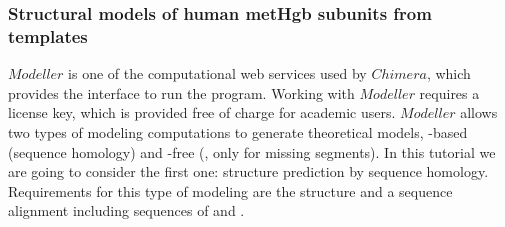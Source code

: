 \subsubsection*{Structural models of human metHgb subunits from templates}

 $Modeller$ \citep{sali1993} is one of the computational web services used by $Chimera$, which provides the interface to run the program. Working with $Modeller$ requires a license key, which is provided free of charge for academic users. $Modeller$ allows two types of modeling computations to generate theoretical models, -based (sequence homology) and -free (, only for missing segments). In this tutorial we are going to consider the first one: structure prediction by sequence homology. Requirements for this type of modeling are the  structure and a sequence alignment including sequences of  and . 
 
